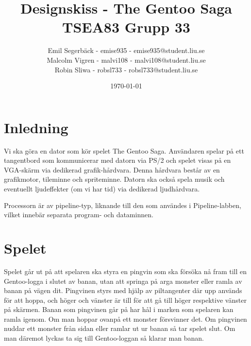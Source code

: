 \documentclass[a4paper,titlepage]{article}
\title{
\textbf{Designskiss - The Gentoo Saga} \\
\large TSEA83 Grupp 33}
\date{\today}
\author{
        Emil Segerbäck - emise935 - emise935@student.liu.se\\
		Malcolm Vigren - malvi108 - malvi108@student.liu.se \\
		Robin Sliwa - robsl733 - robsl733@student.liu.se}
\begin{document}
    \maketitle
    \newpage
\tableofcontents
    \newpage

\section{Inledning}
Vi ska göra en dator som kör spelet The Gentoo Saga. Användaren spelar på ett
tangentbord som kommunicerar med datorn via PS/2 och spelet visas på en
VGA-skärm via dedikerad grafik-hårdvara. Denna hårdvara består av en
grafikmotor, tileminne och spriteminne. Datorn ska också spela musik och
eventuellt ljudeffekter (om vi har tid) via dedikerad ljudhårdvara.

Processorn är av pipeline-typ, liknande till den som användes i
Pipeline-labben, vilket innebär separata program- och dataminnen. 

\section{Spelet}
Spelet går ut på att spelaren ska styra en pingvin som ska försöka nå fram till
en Gentoo-logga i slutet av banan, utan att springa på arga monster eller ramla
av banan på vägen dit. Pingvinen styrs med hjälp av piltangenter där upp används
för att hoppa, och höger och vänster är till för att gå till höger respektive
vänster på skärmen. Banan som pingvinen går på har hål i marken som spelaren kan
ramla igenom. Om man hoppar ovanpå ett monster försvinner det. Om pingvinen
nuddar ett monster från sidan eller ramlar ut ur banan så tar spelet slut. Om
man däremot lyckas ta sig till Gentoo-loggan så klarar man banan.
\end{document}

